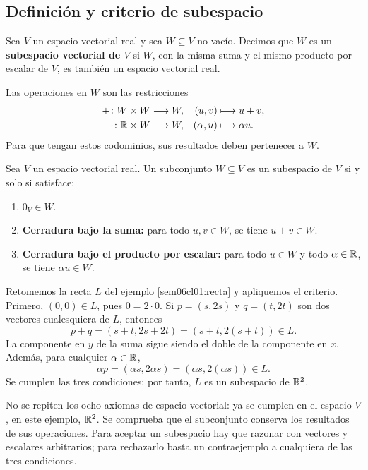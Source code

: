 \documentclass[compacto,10pt]{pubciencias-notas}
\begin{document}
\subsection{Definición y criterio de subespacio}

\begin{defi}\label{sem06cl01:definicion}
    Sea $V$ un espacio vectorial real y sea $W\subseteq V$ no vacío.
    Decimos que $W$ es un \textbf{subespacio vectorial de $V$} si $W$,
    con la misma suma y el mismo producto por escalar de $V$, es también
    un espacio vectorial real.

    Las operaciones en $W$ son las restricciones
    \[
        \begin{aligned}
            +\colon W\times W&\longrightarrow W,
            &(u,v)&\longmapsto u+v,\\
            \cdot\colon\mathbb{R}\times W&\longrightarrow W,
            &(\alpha,u)&\longmapsto\alpha u.
        \end{aligned}
    \]
    Para que tengan estos codominios, sus resultados deben pertenecer a $W$.
\end{defi}

\begin{teo}\label{sem06cl01:criterio}
    Sea $V$ un espacio vectorial real. Un subconjunto $W\subseteq V$
    es un subespacio de $V$ si y solo si satisface:
    \begin{enumerate}
        \item $0_V\in W$.
        \item \textbf{Cerradura bajo la suma:} para todo $u,v\in W$,
              se tiene $u+v\in W$.
        \item \textbf{Cerradura bajo el producto por escalar:} para todo
              $u\in W$ y todo $\alpha\in\mathbb{R}$, se tiene $\alpha u\in W$.
    \end{enumerate}
\end{teo}

Retomemos la recta $L$ del ejemplo \ref{sem06cl01:recta} y apliquemos
el criterio. Primero, $(0,0)\in L$, pues $0=2\cdot0$.
Si $p=(s,2s)$ y $q=(t,2t)$ son dos vectores cualesquiera de $L$, entonces
\[
    p+q=(s+t,2s+2t)=(s+t,2(s+t))\in L.
\]
La componente en $y$ de la suma sigue siendo el doble de la componente
en $x$. Además, para cualquier $\alpha\in\mathbb{R}$,
\[
    \alpha p=(\alpha s,2\alpha s)=(\alpha s,2(\alpha s))\in L.
\]
Se cumplen las tres condiciones; por tanto, $L$ es un subespacio de $\mathbb{R}^2$.

\begin{obs}
    No se repiten los ocho axiomas de espacio vectorial: ya se cumplen en
    el espacio $V$, en este ejemplo, $\mathbb{R}^2$. Se comprueba que el subconjunto conserva los
    resultados de sus operaciones. Para aceptar un subespacio hay que
    razonar con vectores y escalares arbitrarios; para rechazarlo basta
    un contraejemplo a cualquiera de las tres condiciones.
\end{obs}
\end{document}
